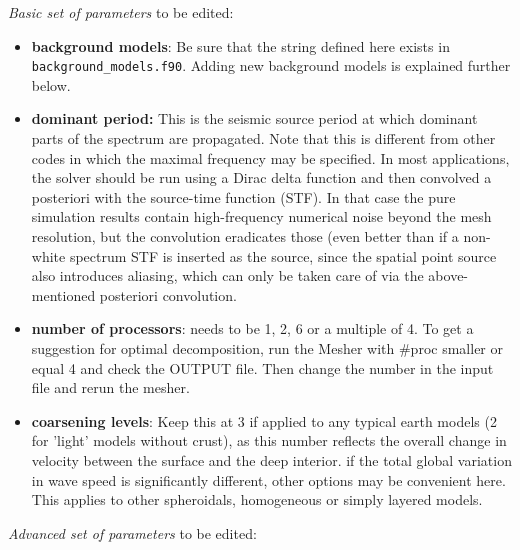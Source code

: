 \documentclass[11pt,letter,fleqn,english,notitlepage]{article}
\begin{document}
\noindent \textit{Basic set of parameters} to be edited:
\begin{itemize}
    \item \textbf{background models}: Be sure that the string defined here exists in 
    {\tt background\_models.f90}. Adding new background models is explained further below.
    
    \item \textbf{dominant period:} This is the seismic source period at which dominant parts 
    of the spectrum are propagated. Note that this is different from other codes in which the 
    maximal frequency may be specified. 
    In most applications, the solver should be run using a Dirac 
    delta function and then convolved a posteriori with the source-time function (STF). In that 
    case the pure simulation results contain high-frequency numerical noise beyond the mesh 
    resolution, but the convolution eradicates those (even better than if a non-white spectrum 
    STF is inserted as the source, since the spatial point source also introduces aliasing, which 
    can only be taken care of via the above-mentioned posteriori convolution.
    
    \item \textbf{number of processors}: needs to be 1, 2, 6 or a multiple of
    4. To get a suggestion for optimal decomposition, run the Mesher with #proc
    smaller or equal 4 and check the OUTPUT file. Then change the number in the
    input file and rerun the mesher.

    \item \textbf{coarsening levels}: Keep this at 3 if applied to any typical earth models
    (2 for 'light' models without crust), as this number reflects the overall
    change in velocity between the surface and the deep interior.  if the total
    global variation in wave speed is significantly different, other options
    may be convenient here. This applies to other spheroidals, homogeneous or
    simply layered models.
\end{itemize}

\newpage
\noindent \textit{Advanced set of parameters} to be edited:
\end{document}
